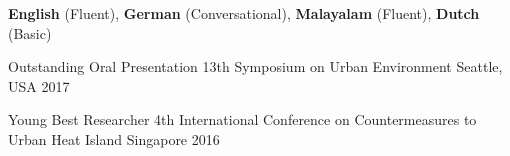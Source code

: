 \documentclass[11pt, a4paper]{preamble/awesome-cv-novo}
\begin{document}

\begin{cvskills}
    \cvskill
    {}
    {\textbf{English} (Fluent), \textbf{German} (Conversational), \textbf{Malayalam} (Fluent), \textbf{Dutch} (Basic)}
\end{cvskills}



\begin{cvhonors}

  \cvhonor
    {Outstanding Oral Presentation} %
    {13th Symposium on Urban Environment} %
    {Seattle, USA} %
    {2017} %

    \cvhonor
    {Young Best Researcher} %
    {4th International Conference on Countermeasures to Urban Heat Island} %
    {Singapore} %
    {2016} %
\end{cvhonors}


\end{document}
